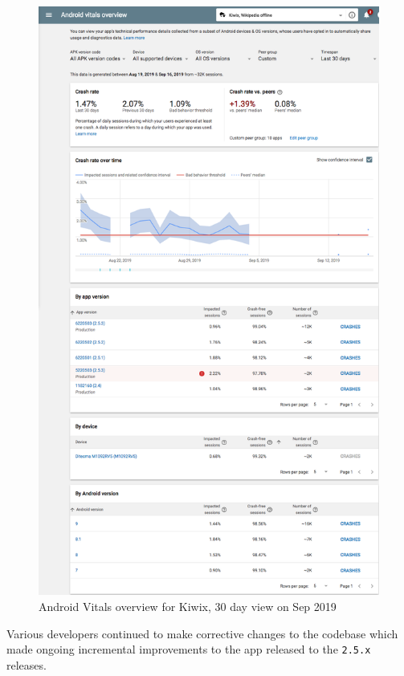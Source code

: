 \begin{figure}
    \centering
    \includegraphics[width=12.5cm]{images/android-vitals-screenshots/Screeenshot_2019_09_20_Android_Vitals_Overview_Kiwix_Google_Play_Console.png}
    \caption{Android Vitals overview for Kiwix, 30 day view on  Sep 2019}
    \label{fig:kiwix_android_vitals_with_gaps_2019_09_20}
\end{figure}


Various developers continued to make corrective changes to the codebase which made ongoing incremental improvements to the app released to the \texttt{2.5.x} releases. 



